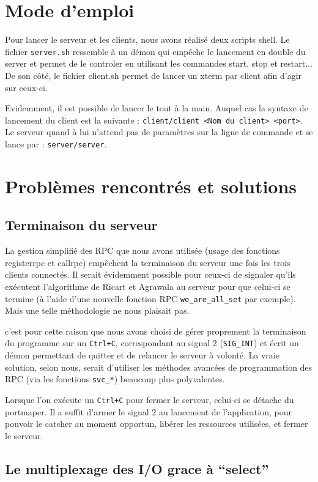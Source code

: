 \section{Mode d'emploi}

Pour lancer le serveur et les clients, nous avons réalisé deux scripts shell. Le fichier \verb|server.sh| ressemble à un démon qui empêche le lancement en double du server et permet de le controler en utilisant les commandes start, stop et restart... De son côté, le fichier client.sh permet de lancer un xterm par client afin d'agir sur ceux-ci.

Evidemment, il est possible de lancer le tout à la main. Auquel cas la syntaxe de lancement du client est la suivante : \verb|client/client <Nom du client> <port>|. Le serveur quand à lui n'attend pas de paramètres sur la ligne de commande et se lance par : \verb|server/server|.

\section{Problèmes rencontrés et solutions}
\subsection{Terminaison du serveur}

La gestion simplifié des RPC que nous avons utilisée (usage des fonctions registerrpc et callrpc) empêchent la terminaison du serveur une fois les trois clients connectés. Il serait évidemment possible pour ceux-ci de signaler qu'ils exécutent l'algorithme de Ricart et Agrawala au serveur pour que celui-ci se termine (à l'aide d'une nouvelle fonction RPC \verb|we_are_all_set| par exemple). Mais une telle méthodologie ne nous plaisait pas.

c'est pour cette raison que nous avons choisi de gérer proprement la terminaison du programme sur un \verb|Ctrl+C|, correspondant au signal 2 (\verb|SIG_INT|) et écrit un démon permettant de quitter et de relancer le serveur à volonté. La vraie solution, selon nous, serait d'utiliser les méthodes avancées de programmation des RPC (via les fonctions \verb|svc_*|) beaucoup plus polyvalentes.

Lorsque l'on exécute un \verb|Ctrl+C| pour fermer le serveur, celui-ci se détache du portmaper. Il a suffit d'armer le signal 2 au lancement de l'application, pour pouvoir le catcher au moment opportun, libérer les ressources utilisées, et fermer le serveur.

\subsection{Le multiplexage des I/O grace à ``select''}

